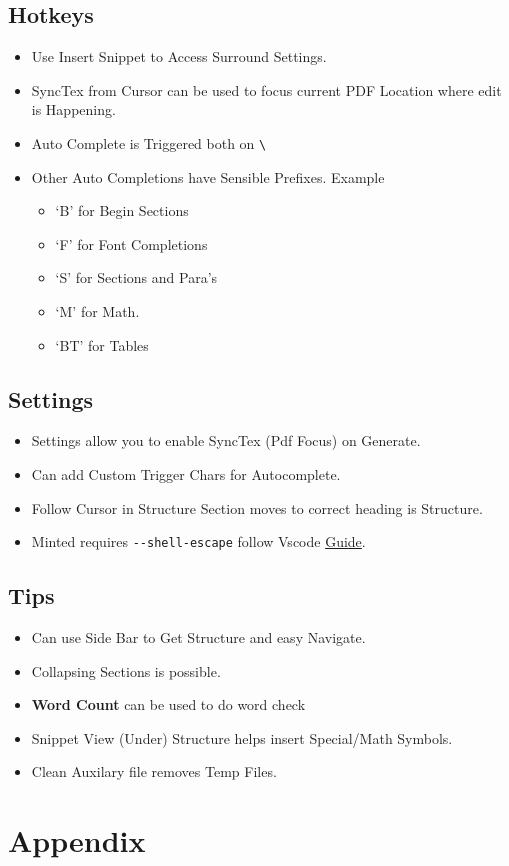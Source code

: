 \documentclass{report}[a4paper,12pt] %
\begin{document}
\subsection{Hotkeys}
\begin{itemize}
  \item Use Insert Snippet to Access Surround Settings.
  \item SyncTex from Cursor can be used to focus current PDF Location where edit is Happening.
  \item Auto Complete is Triggered both on \verb|\|
  \item Other Auto Completions have Sensible Prefixes. Example
  \begin{itemize}
    \item `B' for Begin Sections
    \item `F' for Font Completions
    \item `S' for Sections and Para's
    \item `M' for Math.
    \item `BT' for Tables
  \end{itemize}
\end{itemize}

\subsection{Settings}
\begin{itemize}
  \item Settings allow you to enable SyncTex (Pdf Focus) on Generate.
  \item Can add Custom Trigger Chars for Autocomplete.
  \item Follow Cursor in Structure Section moves to correct heading is Structure.
  \item Minted requires \verb|--shell-escape| follow Vscode \href{https://leportella.com/minted-vscode/}{Guide}.
\end{itemize}

\subsection{Tips}
\begin{itemize}
  \item Can use Side Bar to Get Structure and easy Navigate.
  \item Collapsing Sections is possible.
  \item \textbf{Word Count} can be used to do word check
  \item Snippet View (Under) Structure helps insert Special/Math Symbols.
  \item Clean Auxilary file removes Temp Files.
\end{itemize}


\section*{Appendix}
\begin{appendix}
  \listoffigures
  \listoftables
\end{appendix}
\end{document}
